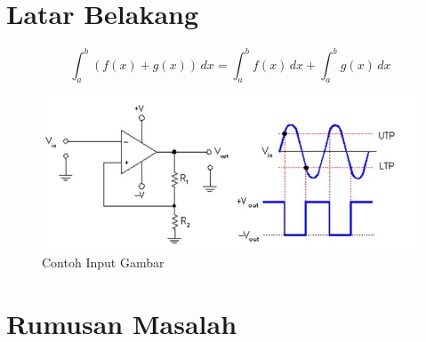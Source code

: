 \lipsum[3]

\section{Latar Belakang}
\lipsum[10-11]
\begin{equation}
  \int^b_a (f(x)+g(x)) \, dx = \int^b_a f(x)\, dx + \int^b_a g(x) \, dx
\end{equation}
\lipsum[90]


\begin{figure}[H]
  \centering
  \label{fig:skema}
  \includegraphics[width=.8\textwidth]{img/skema.jpg}
  \caption{Contoh Input Gambar}
\end{figure}

\section{Rumusan Masalah}
\lipsum[88]\cite{book1,book2}
